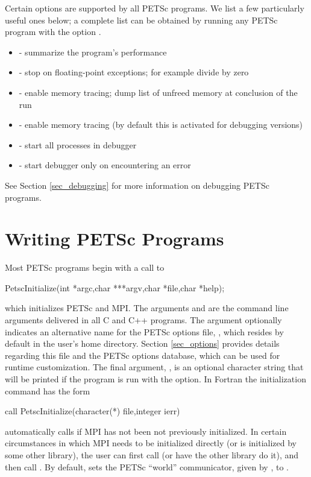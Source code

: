 Certain options are supported by all PETSc programs.  We list a few 
particularly useful ones below; a complete list can be obtained by 
running any PETSc program with the option .
\begin{itemize}
\item {} - summarize the program's performance
\item {} - stop on floating-point exceptions; 
      for example divide by zero
\item {} - enable memory tracing; dump list of unfreed memory 
      at conclusion  of the run
\item {} - enable memory tracing (by default this is 
      activated for debugging versions)
\item {}   
     - start all processes in debugger  
\item {}  
       - start debugger only on encountering an error
\end{itemize}
See Section \ref{sec_debugging} for more information on debugging PETSc programs.

\section{Writing PETSc Programs}
\label{sec_writing}

Most PETSc programs begin with a call to 
\begin{tabbing}
  PetscInitialize(int *argc,char ***argv,char *file,char *help);
\end{tabbing} 
which initializes PETSc and MPI.  The arguments  and 
 are the command line arguments delivered in all C and C++
programs.  The argument 
optionally indicates an alternative name for the PETSc options file,
, which resides by default in the user's home directory.
Section \ref{sec_options} provides details regarding
this file and the PETSc options database, which can be used for runtime
customization. The final argument, , is an optional
character string that will be printed if the program is run with the
 option.  In Fortran the initialization command has the form
\begin{tabbing}
   call PetscInitialize(character(*) file,integer ierr)
\end{tabbing} 
 automatically calls  if MPI
has not been not previously initialized. In certain 
circumstances in which MPI needs to be initialized directly (or is
initialized by some other library), the user can first call 
 (or have the other library do it), and then call
.
By default,  sets the PETSc ``world''
communicator, given by , to .


